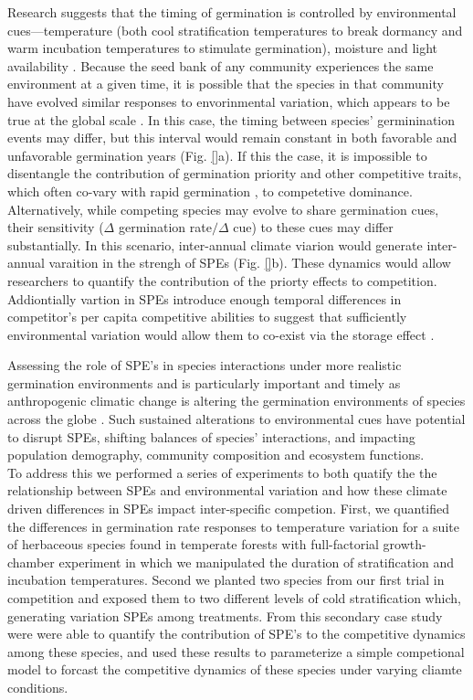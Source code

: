 \documentclass[11pt]{article}\usepackage[]{graphicx}\usepackage[]{color}
\begin{document}
\noindent Research suggests that the timing of germination is controlled by environmental cues---temperature (both cool stratification temperatures to break dormancy and warm incubation temperatures to stimulate germination), moisture and light availability \citep{Bewley1997,Fenner2000}. Because the seed bank of any community experiences the same environment at a given time, it is possible that the species in that community have evolved similar responses to envorinmental variation, which appears to be true at the global scale \citep{Rubio-de-Casas:2017aa}. In this case, the timing between species' germinination events may differ, but this interval would remain constant in both favorable and unfavorable germination years (Fig. \ref{}a). If this the case, it is impossible to disentangle the contribution of germination priority and other competitive traits, which often co-vary with rapid germination \citep{Dickson2012}, to competetive dominance.\\ 

\noindent Alternatively, while competing species may evolve to share germination cues, their sensitivity ($\Delta$ germination rate$/\Delta$ cue) to these cues may differ substantially. In this scenario, inter-annual climate viarion would generate inter-annual varaition in the strengh of SPEs (Fig. \ref{}b). These dynamics would allow researchers to quantify the contribution of the priorty effects to competition. Addiontially vartion in SPEs introduce enough temporal differences in competitor's per capita competitive abilities to suggest that sufficiently environmental variation would allow them to co-exist via the storage effect \citep{}.

\noindent Assessing the role of SPE's in species interactions under more realistic germination environments and is particularly important and timely as anthropogenic climatic change is altering the germination environments of species across the globe \citep{Walck2011}.  Such sustained alterations to environmental cues have potential to disrupt SPEs, shifting balances of species' interactions, and impacting population demography, community composition and ecosystem functions.\\ 

\noindent To address this we performed a series of experiments to both quatify the the relationship between SPEs and environmental variation and how these climate driven differences in SPEs impact inter-specific competion. First, we quantified the differences in germination rate responses to temperature variation for a suite of herbaceous species found in temperate forests with full-factorial growth-chamber experiment in which we manipulated the duration of stratification and incubation temperatures. Second we planted two species from our first trial in competition and exposed them to two different levels of cold stratification which, generating variation SPEs among treatments. From this secondary case study were were able to quantify the contribution of SPE's to the competitive dynamics among these species, and used these results to parameterize a simple competional model to forcast the competitive dynamics of these species under varying cliamte conditions.
\end{document}
